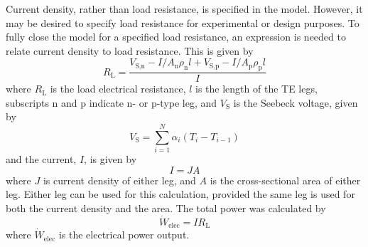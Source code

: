 \documentclass[preprint,authoryear,12pt]{elsarticle}
\begin{document}
Current density, rather than load resistance, is specified in the
model.  However, it may be desired to specify load resistance for
experimental or design purposes.  To fully close the model for a
specified load resistance, an expression is needed to relate current
density to load resistance.  This is given by
\begin{equation}
  \label{eq:current-v-R_L}
  R_{\text{L}} = \frac{V_{\text{S,n}} - I / A_{\text{n}} \rho_{\text{n}} l +
    V_{\text{S,p}} - I / A_{\text{p}} \rho_{\text{p}} l}{I} 
\end{equation}
where $R_{\text{L}}$ is the load electrical resistance, $l$ is the
length of the TE legs, subscripts n and p indicate n- or p-type leg,
and $V_{\text{S}}$ is the Seebeck voltage, given by
\begin{equation}
  \label{eq:V_Seebeck}
  V_{\text{S}} = \sum_{i=1}^N \alpha_i \left( T_i - T_{i-1} \right)
\end{equation}%
and the current, $I$, is given by
\begin{equation}
  \label{eq:current-flux}
  I = J A
\end{equation}
where $J$ is current density of either leg, and $A$ is the
cross-sectional area of either leg.  Either leg can be used for this
calculation, provided the same leg is used for both the current
density and the area. The total power was calculated by
\begin{equation}
  \label{eq:electrical-power}
  \dot{W}_{\text{elec}} = I R_{\text{L}}
\end{equation}
where $\dot{W}_{\text{elec}}$ is the electrical power output.
\end{document}
